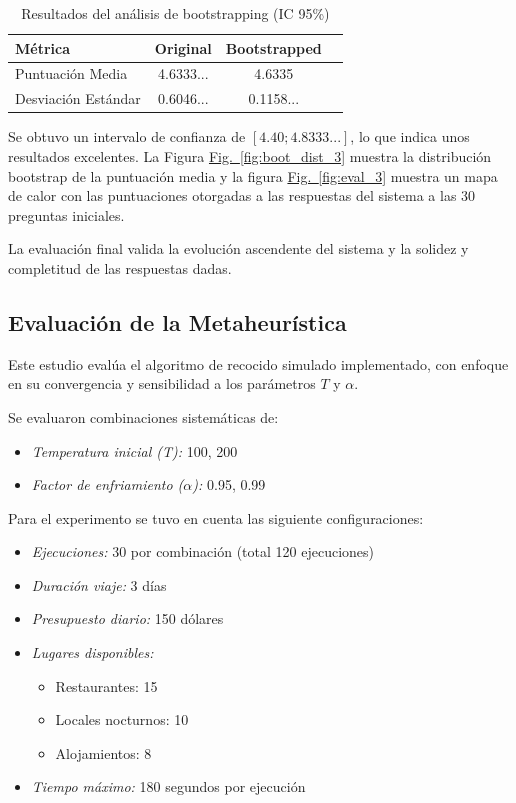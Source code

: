 \documentclass[10pt]{llncs}
\newcommand{\figref}[1]{\hyperref[#1]{Fig.~\ref*{#1}}}
\begin{document}
\begin{table}[h]
\centering
\caption{Resultados del análisis de bootstrapping (IC 95\%)}
\label{tab:boot_results_3}
\begin{tabular}{lccc}
\hline
\textbf{Métrica} & \textbf{Original} & \textbf{Bootstrapped}  \\
\hline 
Puntuación Media& 4.6333... & 4.6335  \\
Desviación Estándar & 0.6046... & 0.1158...  \\
\hline
\end{tabular}
\end{table}

\begin{remark}
Se obtuvo un intervalo de confianza de $[4.40 ; 4.8333...]$, lo que indica unos resultados excelentes. 
La Figura {\figref{fig:boot_dist_3}} muestra la distribución bootstrap de la puntuación media y la figura 
{\figref{fig:eval_3}} muestra un mapa de calor con las puntuaciones otorgadas a las respuestas del sistema a las 
30 preguntas iniciales.
\end{remark}

La evaluación final valida la evolución ascendente del sistema y la solidez y completitud de las respuestas dadas.

\vspace{\baselineskip}
\subsection{Evaluación de la Metaheurística}

Este estudio evalúa el algoritmo de recocido simulado implementado, con enfoque en su convergencia y sensibilidad a los parámetros $T$ y $\alpha$.

Se evaluaron combinaciones sistemáticas de:
\begin{itemize}
    \item \textit{Temperatura inicial (T):} 100, 200
    \item \textit{Factor de enfriamiento ($\alpha$):} 0.95, 0.99
\end{itemize}

Para el experimento se tuvo en cuenta las siguiente configuraciones:
\begin{itemize}
    \item \textit{Ejecuciones:} 30 por combinación (total 120 ejecuciones)
    \item \textit{Duración viaje:} 3 días
    \item \textit{Presupuesto diario:} 150 dólares
    \item \textit{Lugares disponibles:}
    \begin{itemize}
        \item Restaurantes: 15
        \item Locales nocturnos: 10
        \item Alojamientos: 8
    \end{itemize}
    \item \textit{Tiempo máximo:} 180 segundos por ejecución
\end{itemize}
\end{document}
